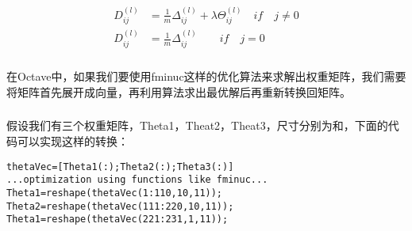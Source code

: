 \documentclass{article}
\begin{document}
\begin{CJK}{UTF8}{gbsn}
\begin{align}
D_{ij}^{(l)} & =\frac{1}{m}\Delta_{ij}^{(l)}+\lambda\Theta_{ij}^{(l)}\quad{if\quad{j\neq0}}\\
D_{ij}^{(l)} & =\frac{1}{m}\Delta_{ij}^{(l)}\qquad{if\quad{j=0}}
\end{align}
\subparagraph{}
在Octave中，如果我们要使用fminuc这样的优化算法来求解出权重矩阵，我们需要将矩阵首先展开成向量，再利用算法求出最优解后再重新转换回矩阵。
\subparagraph{}
假设我们有三个权重矩阵，Theta1，Theat2，Theat3，尺寸分别为和，下面的代码可以实现这样的转换：
\begin{verbatim}
thetaVec=[Theta1(:);Theta2(:);Theta3(:)]
...optimization using functions like fminuc...
Theta1=reshape(thetaVec(1:110,10,11));
Theta2=reshape(thetaVec(111:220,10,11));
Theta1=reshape(thetaVec(221:231,1,11));
\end{verbatim}

\end{CJK}
\end{document}
